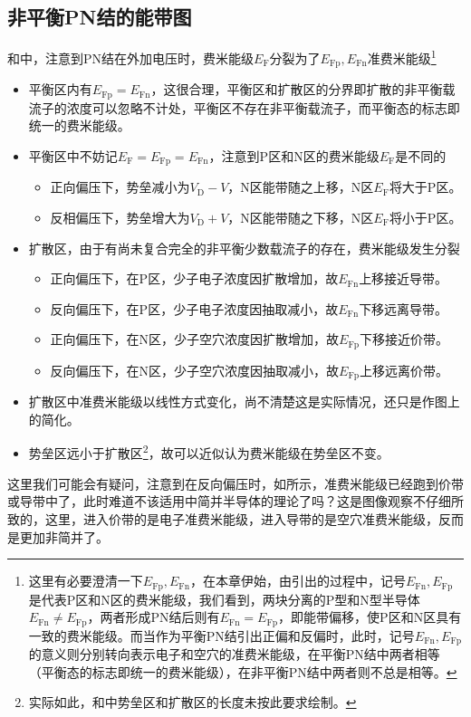 \subsection{非平衡PN结的能带图}
和中，注意到PN结在外加电压时，费米能级$E_\text{F}$分裂为了$E_\text{Fp},E_\text{Fn}$准费米能级\footnote{这里有必要澄清一下$E_\text{Fp},E_\text{Fn}$，在本章伊始，由引出的过程中，记号$E_\text{Fn},E_\text{Fp}$是代表P区和N区的费米能级，我们看到，两块分离的P型和N型半导体$E_\text{Fn}\neq E_\text{Fp}$，两者形成PN结后则有$E_\text{Fn}=E_\text{Fp}$，即能带偏移，使P区和N区具有一致的费米能级。而当作为平衡PN结引出正偏和反偏时，此时，记号$E_\text{Fn},E_\text{Fp}$的意义则分别转向表示电子和空穴的准费米能级，在平衡PN结中两者相等（平衡态的标志即统一的费米能级），在非平衡PN结中两者则不总是相等。}
\begin{itemize}
    \item 平衡区内有$E_\text{Fp}=E_\text{Fn}$，这很合理，平衡区和扩散区的分界即扩散的非平衡载流子的浓度可以忽略不计处，平衡区不存在非平衡载流子，而平衡态的标志即统一的费米能级。
    \item 平衡区中不妨记$E_\text{F}=E_\text{Fp}=E_\text{Fn}$，注意到P区和N区的费米能级$E_\text{F}$是不同的
    \begin{itemize}
        \item 正向偏压下，势垒减小为$V_\text{D}-V$，N区能带随之上移，N区$E_\text{F}$将大于P区。
        \item 反相偏压下，势垒增大为$V_\text{D}+V$，N区能带随之下移，N区$E_\text{F}$将小于P区。
    \end{itemize}
    \item 扩散区，由于有尚未复合完全的非平衡少数载流子的存在，费米能级发生分裂
    \begin{itemize}
        \item 正向偏压下，在P区，少子电子浓度因扩散增加，故$E_\text{Fn}$上移接近导带。
        \item 反向偏压下，在P区，少子电子浓度因抽取减小，故$E_\text{Fn}$下移远离导带。
        \item 正向偏压下，在N区，少子空穴浓度因扩散增加，故$E_\text{Fp}$下移接近价带。
        \item 反向偏压下，在N区，少子空穴浓度因抽取减小，故$E_\text{Fp}$上移远离价带。
    \end{itemize}
    \item 扩散区中准费米能级以线性方式变化，尚不清楚这是实际情况，还只是作图上的简化。
    \item 势垒区远小于扩散区\footnote{实际如此，和中势垒区和扩散区的长度未按此要求绘制。}，故可以近似认为费米能级在势垒区不变。
\end{itemize}
这里我们可能会有疑问，注意到在反向偏压时，如所示，准费米能级已经跑到价带或导带中了，此时难道不该适用中简并半导体的理论了吗？这是图像观察不仔细所致的，这里，进入价带的是电子准费米能级，进入导带的是空穴准费米能级，反而是更加非简并了。\goodbreak

